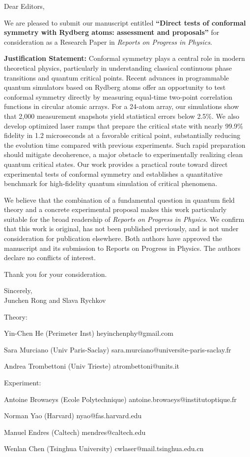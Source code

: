 \documentclass[12pt,a4paper]{article}
\begin{document}
\medskip

Dear Editors,

We are pleased to submit our manuscript entitled
\textbf{``Direct tests of conformal symmetry with Rydberg atoms:
assessment and proposals''} for consideration as a Research Paper in
\textit{Reports on Progress in Physics}.

\textbf{Justification Statement:} Conformal symmetry plays a central role in modern theoretical physics, particularly in understanding classical continuous phase transitions and quantum critical points. Recent advances in programmable quantum simulators based on Rydberg atoms offer an opportunity to test conformal symmetry directly by measuring equal-time two-point correlation functions in circular atomic arrays. For a 24-atom array, our simulations show that 2,000 measurement snapshots yield statistical errors below 2.5\%. We also develop optimized laser ramps that prepare the critical state with nearly 99.9\% fidelity in 1.2 microseconds at a favorable critical point, substantially reducing the evolution time compared with previous experiments. Such rapid preparation should mitigate decoherence, a major obstacle to experimentally realizing clean quantum critical states. Our work provides a practical route toward direct experimental tests of conformal symmetry and establishes a quantitative benchmark for high-fidelity quantum simulation of critical phenomena.

We believe that the combination of a fundamental question in quantum field
theory and a concrete experimental proposal makes this work particularly
suitable for the broad readership of \textit{Reports on Progress in Physics}.
We confirm that this work is original, has not been published previously, and is not under consideration for publication elsewhere. Both authors have approved the manuscript and its submission to Reports on Progress in Physics. The authors declare no conflicts of interest.

Thank you for your consideration.

Sincerely,\\[0.7em]
Junchen Rong and Slava Rychkov

\vskip 8mm

Theory:

Yin-Chen He (Perimeter Inst)  heyinchenphy@gmail.com

Sara Murciano (Univ Paris-Saclay) sara.murciano@universite-paris-saclay.fr

Andrea Trombettoni (Univ Trieste) atrombettoni@units.it

Experiment:

Antoine Browaeys (Ecole Polytechnique) antoine.browaeys@institutoptique.fr

Norman Yao (Harvard) nyao@fas.harvard.edu

Manuel Endres (Caltech) mendres@caltech.edu 

Wenlan Chen (Tsinghua University) cwlaser@mail.tsinghua.edu.cn

 
\end{document}
